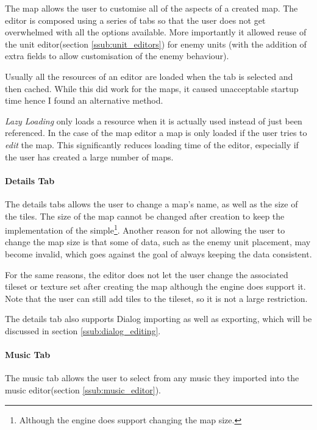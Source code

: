 The map allows the user to customise all of the aspects of a created map.  The editor is composed using a series of tabs so that the user does not get overwhelmed with all the options available. More importantly it allowed reuse of the unit editor(section \ref{ssub:unit_editors}) for enemy units (with the addition  of extra fields to allow customisation of the enemy behaviour).

Usually all the resources of an editor are loaded when the tab is selected and then cached.  While this did work for the maps, it caused unacceptable startup time hence I found an alternative method. 

\emph{Lazy Loading} only loads a resource when it is actually used instead of just been referenced. In the case of the map editor a map is only loaded if the user tries to \emph{edit} the map. This significantly reduces loading time of the editor, especially if the user has created a large number of maps.


\paragraph{Details Tab\\}
The details tabs allows the user to change a map's name, as well as the size of the tiles.  The size of the map cannot be changed after creation to keep the implementation of the simple\footnote{Although the engine does support changing the map size.}. Another reason for not allowing the user to change the map size is that some of data, such as the enemy unit placement, may become invalid, which goes against the goal of always keeping the data consistent.  

For the same reasons, the editor does not let the user change the associated tileset or texture set after creating the map  although the engine does support it. Note that the user can still add tiles to the tileset, so it is not a large restriction.

The details tab also supports Dialog importing as well as exporting, which will be discussed in section \ref{ssub:dialog_editing}.

\paragraph{Music Tab\\}
The music tab allows the user to select from any music they imported into the music editor(section \ref{ssub:music_editor}).

